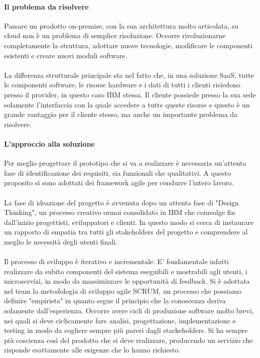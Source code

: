 \paragraph{Il problema da risolvere}
Passare un prodotto on-premise, con la sua architettura molto articolata, su cloud non è un problema di semplice risoluzione. Occorre rivoluzionarne completamente la struttura, adottare nuove tecnologie, modificare le componenti esistenti e creare nuovi moduli software. 

\paragraph{}
La differenza strutturale principale sta nel fatto che, in una soluzione SaaS, tutte le componenti software, le risorse hardware e i dati di tutti i clienti risiedono presso il provider, in questo caso IBM stessa. Il cliente possiede presso la sua sede solamente l'interfaccia con la quale accedere a tutte queste risorse e questo è un grande vantaggio per il cliente stesso, ma anche un importante problema da risolvere. 

\paragraph{L'approccio alla soluzione}
Per meglio progettare il prototipo che si va a realizzare è necessaria un'attenta fase di identificazione dei requisiti, sia funzionali che qualitativi. A questo proposito si sono adottati dei framework agile per condurre l'intero lavoro. 
\paragraph{}
La fase di ideazione del progetto è avvenuta dopo un attenta fase di "Design Thinking", un processo creativo ormai consolidato in IBM che coinvolge fin dall'inizio progettisti, sviluppatori e clienti. In questo modo si cerca di instaurare un rapporto di empatia tra tutti gli stakeholders del progetto e comprendere al meglio le necessità degli utenti finali.
\paragraph{}
Il processo di sviluppo è iterativo e incrementale. E' fondamentale infatti realizzare da subito componenti del sistema eseguibili e mostrabili agli utenti, i microservizi, in modo da massimizzare le opportunità di feedback. Si è adottata nel team la metodologia di sviluppo agile SCRUM, un processo che possiamo definire "empirista" in quanto segue il principio che la conoscenza deriva solamente dall'esperienza. Occorre avere cicli di produzione software molto brevi, nei quali si deve ciclicamente fare analisi, progettazione, implementazione e testing in modo da cogliere sempre più pareri dagli stackeholders. Si ha sempre più coscienza così del prodotto che si deve realizzare, producendo un servizio che risponde esattamente alle esigenze che lo hanno richiesto.

